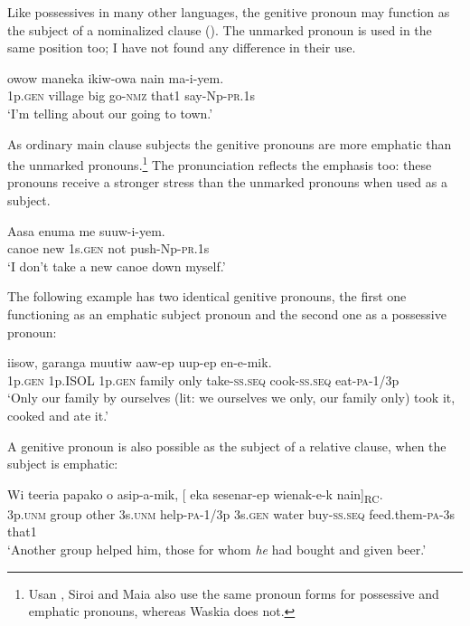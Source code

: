 Like possessives in many other languages, the genitive pronoun may function as the subject of a nominalized clause (). The unmarked pronoun is used in the same position too; I have not found any difference in their use.

\ea%
\label{ex:3:x571}
\gll {} owow maneka ikiw-owa nain ma-i-yem. \\
1p.\textsc{gen} village big go-\textsc{nmz} that1 say-Np-\textsc{pr}.1s\\
\glt`I'm telling about our going to town.'
\z

As ordinary main clause subjects the genitive pronouns are more emphatic than the unmarked pronouns.\footnote{Usan \citep[55]{Reesink1984}, Siroi \citep[20]{Wells1979} and Maia \citep[73]{Hardin2002} also use the same pronoun forms for possessive and emphatic pronouns, whereas Waskia \citep{RossEtAl1978} does not.} The pronunciation reflects the emphasis too: these pronouns receive a stronger stress than the unmarked pronouns when used as a subject.

\ea%
\label{ex:3:x572}
\gll Aasa enuma  me suuw-i-yem. \\
canoe new 1s.\textsc{gen} not push-Np-\textsc{pr}.1s\\
\glt`I don't take a new canoe down myself.'
\z

The following example has two identical genitive pronouns, the first one functioning as an emphatic subject pronoun and the second one as a possessive pronoun:

\ea%
\label{ex:3:x686}
\gll {} iisow,  garanga muutiw aaw-ep uup-ep en-e-mik.\\
1p.\textsc{gen} 1p.ISOL 1p.\textsc{gen} family only take-\textsc{ss}.\textsc{seq} cook-\textsc{ss}.\textsc{seq} eat-\textsc{pa}-1/3p\\
\glt`Only our family by ourselves (lit: we ourselves we only, our family only) took it, cooked and ate it.'
\z

A genitive pronoun is also possible as the subject of a relative clause, when the subject is emphatic:

\ea%
\label{ex:3:x1809}
\gll Wi teeria papako o asip-a-mik, [ eka sesenar-ep wienak-e-k nain]\textsubscript{RC}.
\\
3p.\textsc{unm} group other 3s.\textsc{unm} help-\textsc{pa}-1/3p 3s.\textsc{gen} water buy-\textsc{ss}.\textsc{seq} feed.them-\textsc{pa}-3s that1\\
\glt`Another group helped him, those for whom \textit{he} had bought and given beer.'
\z

